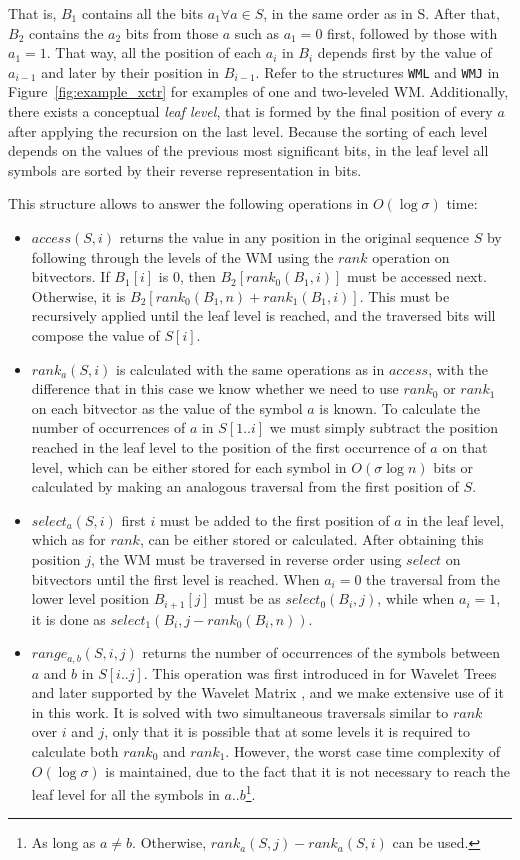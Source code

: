 \documentclass[runningheads]{llncs}
\begin{document}
That is, $B_1$ contains all the bits $a_1 \forall a \in S$, in the same order as in S. After that, $B_2$ contains the $a_2$ bits from those $a$ such as $a_1 = 0$ first, followed by those with $a_1 = 1$. That way, all the position of each $a_i$ in $B_i$ depends first by the value of $a_{i-1}$ and later by their position in $B_{i-1}$. Refer to the structures \texttt{WML} and \texttt{WMJ} in Figure~\ref{fig:example_xctr} for examples of one and two-leveled WM. Additionally, there exists a conceptual \textit{leaf level}, that is formed by the final position of every $a$ after applying the recursion on the last level. Because the sorting of each level depends on the values of the previous most significant bits, in the leaf level all symbols are sorted by their reverse representation in bits.

This structure allows to answer the following operations in $O(\log\sigma)$ time:
\begin{itemize}
    \item $access(S,i)$ returns the value in any position in the original sequence $S$ by following through the levels of the WM using the $rank$ operation on bitvectors. If $B_1[i]$ is 0, then $B_2[rank_0(B_1,i)]$ must be accessed next. Otherwise, it is $B_2[rank_0(B_1,n) + rank_1(B_1,i)]$. This must be recursively applied until the leaf level is reached, and the traversed bits will compose the value of $S[i]$.
    \item $rank_a(S,i)$ is calculated with the same operations as in $access$, with the difference that in this case we know whether we need to use $rank_0$ or $rank_1$ on each bitvector as the value of the symbol $a$ is known. To calculate the number of occurrences of $a$ in $S[1..i]$ we must simply subtract the position reached in the leaf level to the position of the first occurrence of $a$ on that level, which can be either stored for each symbol in $O(\sigma\log n)$ bits or calculated by making an analogous traversal from the first position of $S$.
    \item $select_a(S,i)$ first $i$ must be added to the first position of $a$ in the leaf level, which as for $rank$, can be either stored or calculated. After obtaining this position $j$, the WM must be traversed in reverse order using $select$ on bitvectors until the first level is reached. When $a_i=0$ the traversal from the lower level position $B_{i+1}[j]$ must be as $select_0(B_i,j)$, while when $a_i=1$, it is done as $select_1(B_i,j-rank_0(B_{i},n))$.
    \item $range_{a,b}(S,i,j)$ returns the number of occurrences of the symbols between $a$ and $b$ in $S[i..j]$. This operation was first introduced in \cite{gagie2012new} for Wavelet Trees and later supported by the Wavelet Matrix \cite{CNO15}, and we make extensive use of it in this work. It is solved with two simultaneous traversals similar to $rank$ over $i$ and $j$, only that it is possible that at some levels it is required to calculate both $rank_0$ and $rank_1$. However, the worst case time complexity of $O(\log\sigma)$ is maintained, due to the fact that it is not necessary to reach the leaf level for all the symbols in $a..b$\footnote{As long as $a\neq b$. Otherwise, $rank_a(S,j)-rank_a(S,i)$ can be used.}.
\end{itemize}
\end{document}
